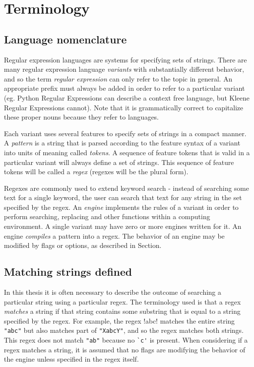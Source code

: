 \section{Terminology}

\subsection{Language nomenclature}
\label{sec:nomenclature}
Regular expression languages are systems for specifying sets of strings.  There are many regular expression language \emph{variants} with substantially different behavior, and so the term \emph{regular expression} can only refer to the topic in general.  An appropriate prefix must always be added in order to refer to a particular variant (eg. Python Regular Expressions can describe a context free language, but Kleene Regular Expressions cannot).  Note that it is grammatically correct to capitalize these proper nouns because they refer to languages.

Each variant uses several features to specify sets of strings in a compact manner.  A \emph{pattern} is a string that is parsed according to the feature syntax of a variant into units of meaning called \emph{tokens}.  A sequence of feature tokens that is valid in a particular variant will always define a set of strings.  This sequence of feature tokens will be called a \emph{regex} (regexes will be the plural form).

Regexes are commonly used to extend keyword search - instead of searching some text for a single keyword, the user can search that text for any string in the set specified by the regex.   An \emph{engine} implements the rules of a variant in order to perform searching, replacing and other functions within a computing environment.  A single variant may have zero or more engines written for it.  An engine \emph{compiles} a pattern into a regex.  The behavior of an engine may be modified by flags or options, as described in Section.

\subsection{Matching strings defined}
\label{sec:matchingDefined}
In this thesis it is often necessary to describe the outcome of searching a particular string using a particular regex.  The terminology used is that a regex \emph{matches} a string if that string contains some substring that is equal to a string specified by the regex.  For example, the regex \cverb!abc! matches the entire string \verb!"abc"! but also matches part of \verb!"XabcY"!, and so the regex matches both strings.  This regex does not match \verb!"ab"! because no \verb!`c'! is present.  When considering if a regex matches a string, it is assumed that no flags are modifying the behavior of the engine unless specified in the regex itself.

